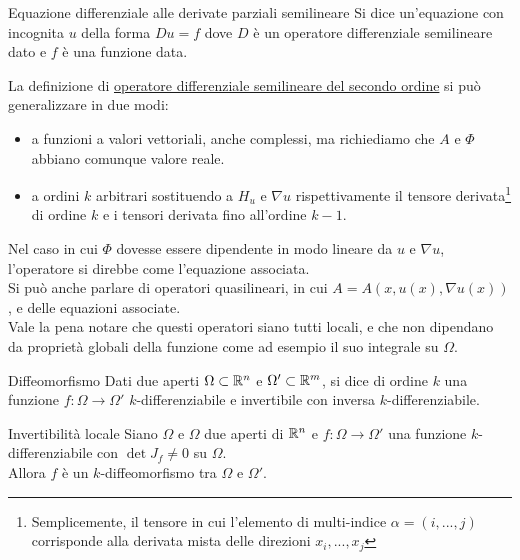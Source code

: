 \documentclass{article}
\begin{document}
\begin{definition}{Equazione differenziale alle derivate parziali semilineare}{}
    Si dice  un'equazione con incognita $u$ della forma $Du = f$ dove $D$ è un operatore differenziale semilineare dato e $f$ è una funzione data.
\end{definition}

\begin{remark}{}{}
    La definizione di \href{def:ODS2}{operatore differenziale semilineare del secondo ordine} si può generalizzare in due modi:\begin{itemize}
        \item a funzioni a valori vettoriali, anche complessi, ma richiediamo che $A$ e $\Phi$ abbiano comunque valore reale.
        \item a ordini $k$ arbitrari sostituendo a $H_u$ e $\nabla u$  rispettivamente il tensore derivata\footnote{Semplicemente, il tensore in cui l'elemento di multi-indice $\alpha = (i,...,j)$ corrisponde alla derivata mista delle direzioni $x_i,...,x_j$} di ordine $k$ e i tensori derivata fino all'ordine $k-1$.
    \end{itemize}
    Nel caso in cui $\Phi$ dovesse essere dipendente in modo lineare da $u$ e $\nabla u$, l'operatore si direbbe  come l'equazione associata.\\
    Si può anche parlare di operatori quasilineari, in cui $A = A(x,u(x),\nabla u(x))$, e delle equazioni associate.\\
    Vale la pena notare che questi operatori siano tutti locali, e che non dipendano da proprietà globali della funzione come ad esempio il suo integrale su $\Omega$.
\end{remark}

\begin{definition}{Diffeomorfismo}{}
    Dati due aperti $\Omega\subset \mathbb{R}^n$ e $\Omega'\subset \mathbb{R}^m$, si dice  di ordine $k$ una funzione $f:\Omega \to \Omega'$ $k$-differenziabile e invertibile con inversa $k$-differenziabile.
\end{definition}

\begin{theorem}{Invertibilità locale}{}
    Siano $\Omega$ e $\Omega$ due aperti di $\mathbb{R}^n$ e $f:\Omega\to\Omega'$ una funzione $k$-differenziabile con $\det J_f \neq 0$ su $\Omega$.\\
    Allora $f$ è un $k$-diffeomorfismo tra $\Omega$ e $\Omega'$.
\end{theorem}
\end{document}
